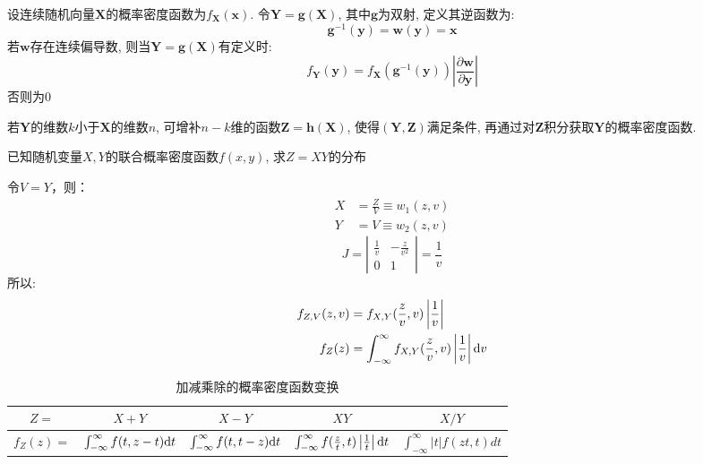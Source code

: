 \begin{theorem}[多变量函数的概率函数变换]
    设连续随机向量$\mathbf{X}$的概率密度函数为$f_\mathbf{X}(\mathbf{x})$. 令$\mathbf{Y}=\mathbf{g}(\mathbf{X})$, 其中$\mathbf{g}$为双射, 定义其逆函数为:
    \[ \mathbf{g}^{-1}(\mathbf{y})=\mathbf{w}(\mathbf{y})=\mathbf{x} \]
    若$\mathbf{w}$存在连续偏导数, 则当$\mathbf{Y}=\mathbf{g}(\mathbf{X})$有定义时:
    \[ f_\mathbf{Y}(\mathbf{y})=f_\mathbf{X}(\mathbf{g}^{-1}(\mathbf{y}))\left| \frac{\partial \mathbf{w}}{\partial \mathbf{y}} \right|  \]
    否则为$0$
\end{theorem}

\begin{remark}
    若$\mathbf{Y}$的维数$k$小于$\mathbf{X}$的维数$n$, 可增补$n-k$维的函数$\mathbf{Z}=\mathbf{h}(\mathbf{X})$, 使得$(\mathbf{Y},\mathbf{Z})$满足条件, 再通过对$\mathbf{Z}$积分获取$\mathbf{Y}$的概率密度函数.
\end{remark}

\begin{example}[连续变量之积]\label{ex:product_of_variable}
    已知随机变量$X,Y$的联合概率密度函数$f(x,y)$, 求$Z=XY$的分布
\end{example}
\begin{solution}
    令$V=Y$，则：
    \begin{align*}
        X & = \frac{Z}{V} \equiv w_{1}(z, v) \\
        Y & = V \equiv w_{2}(z, v)
    \end{align*}
    \[ J=\left|\begin{array}{cc}\frac{1}{v} & -\frac{z}{v^2} \\ 0 & 1 \end{array}\right|=\frac{1}{v}\]
    所以:
    \begin{align*}
        f_{Z,V}(z, v) & = f_{X,Y}(\frac{z}{v},v)\left| \frac{1}{v} \right|                              \\
        f_{Z}(z)      & = \int_{-\infty}^{\infty} f_{X,Y}(\frac{z}{v},v)\left| \frac{1}{v} \right| \mathrm{d} v
    \end{align*}
\end{solution}

\begin{table}
    \centering
    \begin{tabular}{ccccc}
        \toprule
        $Z=$      & $X+Y$                                 & $X-Y$                                 & $XY$                                                                      & $X/Y$                                 \\
        \midrule
        $f_Z(z)=$ & $\int_{-\infty}^{\infty}f(t,z-t)\mathrm{d} t$ & $\int_{-\infty}^{\infty}f(t,t-z)\mathrm{d} t$ & $\int_{-\infty}^{\infty} f(\frac{z}{t},t)\left| \frac{1}{t} \right| \mathrm{d} t$ & $\int_{-\infty}^{\infty}|t|f(zt,t)dt$ \\
        \bottomrule
    \end{tabular}
    \caption[short]{加减乘除的概率密度函数变换}
\end{table}

